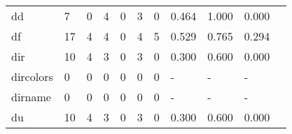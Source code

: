 \begin{longtable}{lp{1.2cm}p{1.2cm}p{1.2cm}p{1.2cm}p{1.2cm}p{1.2cm}p{1.2cm}p{1.2cm}p{1.2cm}p{1.2cm}}
dd        &                                     7 &                                                  0 &                                                4 &                                               0 &                                                3 &                                              0 &                                              0.464 &                                              1.000 &                                              0.000 \\
df        &                                    17 &                                                  4 &                                                4 &                                               0 &                                                4 &                                              5 &                                              0.529 &                                              0.765 &                                              0.294 \\
dir       &                                    10 &                                                  4 &                                                3 &                                               0 &                                                3 &                                              0 &                                              0.300 &                                              0.600 &                                              0.000 \\
dircolors &                                     0 &                                                  0 &                                                0 &                                               0 &                                                0 &                                              0 &                                                  - &                                                  - &                                                  - \\
dirname   &                                     0 &                                                  0 &                                                0 &                                               0 &                                                0 &                                              0 &                                                  - &                                                  - &                                                  - \\
du        &                                    10 &                                                  4 &                                                3 &                                               0 &                                                3 &                                              0 &                                              0.300 &                                              0.600 &                                              0.000 \\

\end{longtable}
